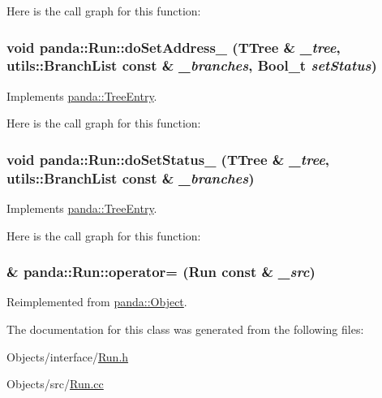 Here is the call graph for this function:\hypertarget{classpanda_1_1Run_a1fed64cabd5142e8b6981fdbadd9d2ae}{
\subsubsection[{doSetAddress\_\-}]{\setlength{\rightskip}{0pt plus 5cm}void panda::Run::doSetAddress\_\- (TTree \& {\em \_\-tree}, \/  {\bf utils::BranchList} const \& {\em \_\-branches}, \/  Bool\_\-t {\em setStatus})}}
\label{classpanda_1_1Run_a1fed64cabd5142e8b6981fdbadd9d2ae}


Implements \hyperlink{classpanda_1_1TreeEntry_abdb184144bf5a4ca8b0fdb6d06c5d4c1}{panda::TreeEntry}.

Here is the call graph for this function:\hypertarget{classpanda_1_1Run_a6e0400b56778094d6ac8c6c9aa8eba3a}{
\subsubsection[{doSetStatus\_\-}]{\setlength{\rightskip}{0pt plus 5cm}void panda::Run::doSetStatus\_\- (TTree \& {\em \_\-tree}, \/  {\bf utils::BranchList} const \& {\em \_\-branches})}}
\label{classpanda_1_1Run_a6e0400b56778094d6ac8c6c9aa8eba3a}


Implements \hyperlink{classpanda_1_1TreeEntry_a8c17222accba71d53b73ad6e2c3276a2}{panda::TreeEntry}.

Here is the call graph for this function:\hypertarget{classpanda_1_1Run_a24e3e257fd9432fdec3a307b3a6eb6a3}{
\subsubsection[{operator=}]{ \& panda::Run::operator= ({\bf Run} const \& {\em \_\-src})}}
\label{classpanda_1_1Run_a24e3e257fd9432fdec3a307b3a6eb6a3}


Reimplemented from \hyperlink{classpanda_1_1Object_a083629646c455db50ea99b994aac3b7b}{panda::Object}.

The documentation for this class was generated from the following files:\begin{DoxyCompactItemize}
\item 
Objects/interface/\hyperlink{Run_8h}{Run.h}\item 
Objects/src/\hyperlink{Run_8cc}{Run.cc}\end{DoxyCompactItemize}
